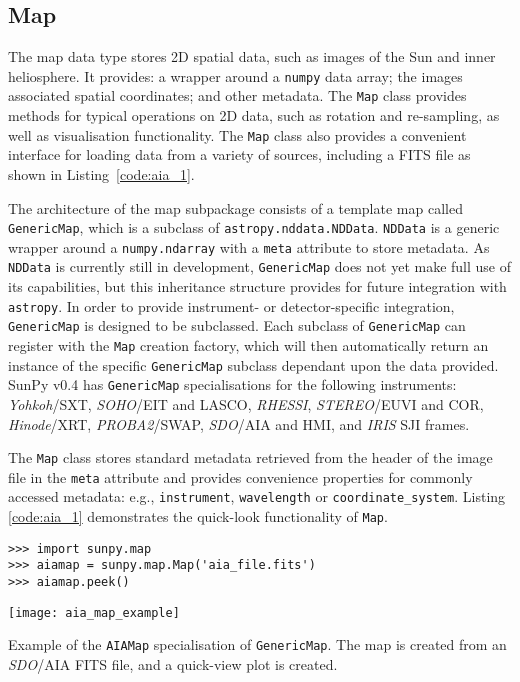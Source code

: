 \subsection{Map}\label{ssec:map}
The map data type stores 2D spatial data, such as images of the Sun and 
inner heliosphere. It provides: a wrapper around a \texttt{numpy} data array; 
the images associated spatial coordinates; and other metadata. The \texttt{Map} 
class provides methods for typical operations on 2D data, such as rotation and 
re-sampling, as well as visualisation functionality.
The \texttt{Map} class also provides a convenient interface for loading data 
from a variety of sources, including a FITS file as shown in 
Listing~\ref{code:aia_1}.

The architecture of the map subpackage consists of a template map called
\texttt{GenericMap}, which is a subclass of \texttt{astropy.nddata.NDData}. 
\texttt{NDData} is a generic wrapper around a \texttt{numpy.ndarray} with a 
\texttt{meta} attribute to store metadata.
As \texttt{NDData} is currently still in development, \texttt{GenericMap} does 
not yet make full use of its capabilities, but this inheritance structure 
provides for future integration with \texttt{astropy}. In order to provide 
instrument- or detector-specific integration, \texttt{GenericMap} is designed
to be subclassed. Each subclass of \texttt{GenericMap} can register 
with the \texttt{Map} creation factory, which will then automatically return an instance
of the specific \texttt{GenericMap} subclass dependant upon the data provided. 
SunPy v0.4 has \texttt{GenericMap} specialisations for the following 
instruments: 
\textit{Yohkoh}/SXT, \textit{SOHO}/EIT and LASCO, \textit{RHESSI}, 
\textit{STEREO}/EUVI and COR, \textit{Hinode}/XRT,
\textit{PROBA2}/SWAP, \textit{SDO}/AIA and HMI, 
and \textit{IRIS} SJI frames. 

The \texttt{Map} class stores standard metadata retrieved from the header of 
the image file in the \texttt{meta} attribute and provides convenience 
properties for commonly accessed metadata: e.g., \texttt{instrument}, 
\texttt{wavelength} or \texttt{coordinate\_system}. 
Listing \ref{code:aia_1} demonstrates the quick-look functionality of 
\texttt{Map}.

\begin{listing}[H]
\begin{verbatim}
>>> import sunpy.map
>>> aiamap = sunpy.map.Map('aia_file.fits')
>>> aiamap.peek()
\end{verbatim}
\begin{center}
\texttt{[image: aia\_map\_example]}
\end{center}
\caption{Example of the \texttt{AIAMap} specialisation of 
\texttt{GenericMap}. The map is created from an \textit{SDO}/AIA FITS file,
and a quick-view plot is created.}
\label{code:aia_1}
\end{listing}

